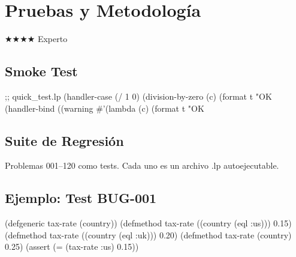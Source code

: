 \chapter{Pruebas y Metodología}
\label{chap:testing}
{\huge$\bigstar$}{\huge$\bigstar$}{\huge$\bigstar$}{\huge$\bigstar$} Experto

\section{Smoke Test}
\begin{lispcode}
;; quick_test.lp
(handler-case (/ 1 0) (division-by-zero (c) (format t "OK~%
(handler-bind ((warning #'(lambda (c) (format t "OK~%
\end{lispcode}

\section{Suite de Regresión}
Problemas 001--120 como tests. Cada uno es un archivo .lp autoejecutable.

\section{Ejemplo: Test BUG-001}
\begin{lispcode}
(defgeneric tax-rate (country))
(defmethod tax-rate ((country (eql :us))) 0.15)
(defmethod tax-rate ((country (eql :uk))) 0.20)
(defmethod tax-rate (country) 0.25)
(assert (= (tax-rate :us) 0.15))
\end{lispcode}

